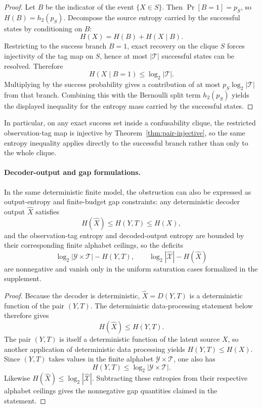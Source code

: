 \begin{proof}
Let $B$ be the indicator of the event $\{X\in S\}$. Then $\Pr[B=1]=p_S$, so $H(B)=h_2(p_S)$. Decompose the source entropy carried by the successful states by conditioning on $B$:
\[
H(X)=H(B)+H(X\mid B).
\]
Restricting to the success branch $B=1$, exact recovery on the clique $S$ forces injectivity of the tag map on $S$, hence at most $|\mathcal T|$ successful states can be resolved. Therefore
\[
H(X\mid B=1) \le \log_2 |\mathcal T|.
\]
Multiplying by the success probability gives a contribution of at most $p_S\log_2 |\mathcal T|$ from that branch. Combining this with the Bernoulli split term $h_2(p_S)$ yields the displayed inequality for the entropy mass carried by the successful states.
\end{proof}

In particular, on any exact success set inside a confusability clique, the restricted observation-tag map is injective by Theorem~\ref{thm:pair-injective}, so the same entropy inequality applies directly to the successful branch rather than only to the whole clique.

\paragraph{Decoder-output and gap formulations.}
In the same deterministic finite model, the obstruction can also be expressed as output-entropy and finite-budget gap constraints: any deterministic decoder output $\hat X$ satisfies
\[
H(\hat X)\le H(Y,T)\le H(X),
\]
and the observation-tag entropy and decoded-output entropy are bounded by their corresponding finite alphabet ceilings, so the deficits
\[
\log_2 |\mathcal Y\times \mathcal T|-H(Y,T),
\qquad
\log_2 |\widehat{\mathcal X}|-H(\hat X)
\]
are nonnegative and vanish only in the uniform saturation cases formalized in the supplement.

\begin{proof}
Because the decoder is deterministic, $\hat X=D(Y,T)$ is a deterministic function of the pair $(Y,T)$. The deterministic data-processing statement below therefore gives
\[
H(\hat X)\le H(Y,T).
\]
The pair $(Y,T)$ is itself a deterministic function of the latent source $X$, so another application of deterministic data processing yields $H(Y,T)\le H(X)$. Since $(Y,T)$ takes values in the finite alphabet $\mathcal Y\times\mathcal T$, one also has
\[
H(Y,T)\le \log_2 |\mathcal Y\times\mathcal T|.
\]
Likewise $H(\hat X)\le \log_2 |\widehat{\mathcal X}|$. Subtracting these entropies from their respective alphabet ceilings gives the nonnegative gap quantities claimed in the statement.
\end{proof}

